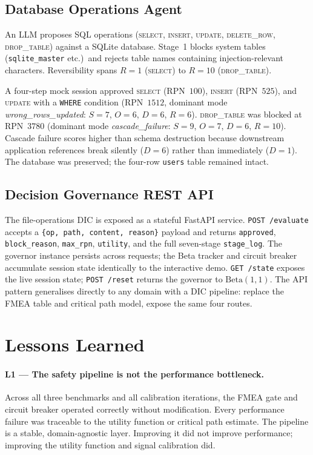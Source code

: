 \documentclass[11pt,letterpaper]{article}
\begin{document}
\subsection{Database Operations Agent}

An LLM proposes SQL operations (\textsc{select}, \textsc{insert}, \textsc{update},
\textsc{delete\_row}, \textsc{drop\_table}) against a SQLite database.
Stage~1 blocks system tables (\texttt{sqlite\_master} etc.)\ and rejects table
names containing injection-relevant characters.
Reversibility spans $R{=}1$ (\textsc{select}) to $R{=}10$ (\textsc{drop\_table}).

A four-step mock session approved \textsc{select} (RPN~$100$), \textsc{insert}
(RPN~$525$), and \textsc{update} with a \texttt{WHERE} condition
(RPN~$1512$, dominant mode \textit{wrong\_rows\_updated}: $S{=}7$, $O{=}6$,
$D{=}6$, $R{=}6$). \textsc{drop\_table} was blocked at RPN~$3780$ (dominant mode
\textit{cascade\_failure}: $S{=}9$, $O{=}7$, $D{=}6$, $R{=}10$).
Cascade failure scores higher than schema destruction because downstream
application references break silently ($D{=}6$) rather than immediately ($D{=}1$).
The database was preserved; the four-row \texttt{users} table remained intact.

\subsection{Decision Governance REST API}

The file-operations DIC is exposed as a stateful FastAPI service.
\texttt{POST /evaluate} accepts a \texttt{\{op, path, content, reason\}} payload
and returns \texttt{approved}, \texttt{block\_reason}, \texttt{max\_rpn},
\texttt{utility}, and the full seven-stage \texttt{stage\_log}.
The governor instance persists across requests; the Beta tracker and circuit
breaker accumulate session state identically to the interactive demo.
\texttt{GET /state} exposes the live session state; \texttt{POST /reset} returns
the governor to $\mathrm{Beta}(1,1)$.
The API pattern generalises directly to any domain with a DIC pipeline: replace
the FMEA table and critical path model, expose the same four routes.

\section{Lessons Learned}
\label{sec:lessons}

\paragraph{L1 --- The safety pipeline is not the performance bottleneck.}
Across all three benchmarks and all calibration iterations, the FMEA gate and
circuit breaker operated correctly without modification. Every performance failure
was traceable to the utility function or critical path estimate. The pipeline is
a stable, domain-agnostic layer. Improving it did not improve performance;
improving the utility function and signal calibration did.
\end{document}
